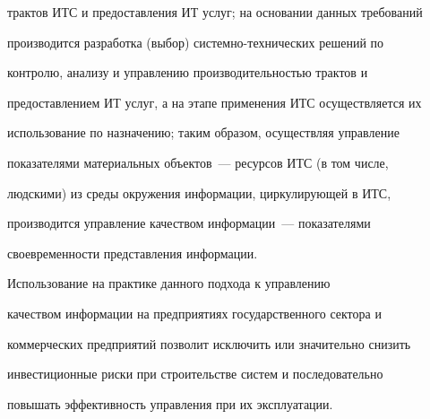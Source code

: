 трактов ИТС и предоставления ИТ услуг; на основании данных требований 


производится разработка (выбор) сис\-тем\-но-тех\-ни\-че\-ских решений по 


контролю, анализу и управлению производительностью трактов и 


предоставлением ИТ услуг, а на этапе применения ИТС осуществляется их 


использование по назначению; таким образом, осуществляя управление 


показателями материальных объектов~--- ресурсов ИТС (в том числе, 


людскими) из среды окружения информации, циркулирующей в ИТС, 


производится управление качеством информации~--- показателями 


своевременности представления информации.





        Использование на практике данного подхода к управлению 


качеством информации на предприятиях государственного сектора и 


коммерческих предприятий позволит исключить или значительно снизить 


инвестиционные риски при строительстве систем и последовательно 


повышать эффективность управления при их эксплуатации.





